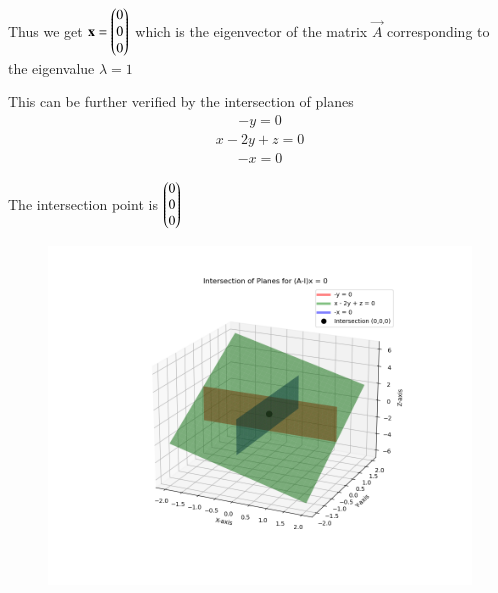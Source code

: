 \documentclass[journal]{IEEEtran}
\begin{document}
Thus we get $\mathbf{x} = \begin{pmatrix}0 \\ 0 \\ 0\end{pmatrix}$ which is the eigenvector of the matrix $\vec{A}$ corresponding to the eigenvalue $\lambda = 1$

This can be further verified by the intersection of planes
\begin{align}
-y = 0
\end{align}
\begin{align}
x-2y+z=0
\end{align}
\begin{align}
-x = 0
\end{align}

The intersection point is $\begin{pmatrix}0 \\ 0 \\ 0\end{pmatrix}$
    \begin{figure}[H]
        \centering
        \includegraphics[height=0.5\textheight, keepaspectratio]{figs/Figure_1.png}
        \label{figure_1}
    \end{figure}
\end{document}

